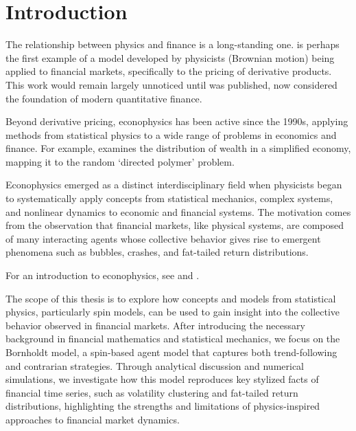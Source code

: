 \chapter{Introduction}\label{ch:introduction}
The relationship between physics and finance is a long-standing one. \cite{bachelier} is perhaps the first example of a model developed by physicists (Brownian motion) being applied to financial markets, specifically to the pricing of derivative products. This work would remain largely unnoticed until \cite{black_scholes} was published, now considered the foundation of modern quantitative finance.

Beyond derivative pricing, econophysics has been active since the 1990s, applying methods from statistical physics to a wide range of problems in economics and finance. For example, \cite{bouchaud_mezard_2000} examines the distribution of wealth in a simplified economy, mapping it to the random `directed polymer' problem.

Econophysics emerged as a distinct interdisciplinary field when physicists began to systematically apply concepts from statistical mechanics, complex systems, and nonlinear dynamics to economic and financial systems. The motivation comes from the observation that financial markets, like physical systems, are composed of many interacting agents whose collective behavior gives rise to emergent phenomena such as bubbles, crashes, and fat-tailed return distributions.

For an introduction to econophysics, see \cite{Mantegna_Stanley_1999} and \cite{econophysics_2011_review}.

The scope of this thesis is to explore how concepts and models from statistical physics, particularly spin models, can be used to gain insight into the collective behavior observed in financial markets. After introducing the necessary background in financial mathematics and statistical mechanics, we focus on the Bornholdt model, a spin-based agent model that captures both trend-following and contrarian strategies. Through analytical discussion and numerical simulations, we investigate how this model reproduces key stylized facts of financial time series, such as volatility clustering and fat-tailed return distributions, highlighting the strengths and limitations of physics-inspired approaches to financial market dynamics.